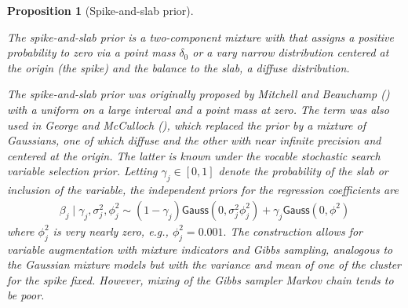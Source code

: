 \documentclass[
  11pt,
  letterpaper,
]{scrbook}
\theoremstyle{plain}
\newtheorem{proposition}{Proposition}[chapter]
\theoremstyle{definition}
\theoremstyle{definition}
\theoremstyle{plain}
\theoremstyle{plain}
\theoremstyle{definition}
\theoremstyle{remark}
\begin{document}
\begin{proposition}[Spike-and-slab
prior]\protect\hypertarget{prp-spike-slab}{}\label{prp-spike-slab}

The spike-and-slab prior is a two-component mixture with that assigns a
positive probability to zero via a point mass \(\delta_0\) or a vary
narrow distribution centered at the origin (the spike) and the balance
to the slab, a diffuse distribution.

The spike-and-slab prior was originally proposed by Mitchell and
Beauchamp () with a uniform
on a large interval and a point mass at zero. The term was also used in
George and McCulloch (), which
replaced the prior by a mixture of Gaussians, one of which diffuse and
the other with near infinite precision and centered at the origin. The
latter is known under the vocable stochastic search variable selection
prior. Letting \(\gamma_j \in [0,1]\) denote the probability of the slab
or inclusion of the variable, the independent priors for the regression
coefficients are \begin{align*}
 \beta_j \mid \gamma_j, \sigma_j^2,\phi^2_j \sim (1-\gamma_j) \mathsf{Gauss}(0, \sigma_j^2\phi^2_j) + \gamma_j \mathsf{Gauss}(0, \phi^2)
\end{align*} where \(\phi^2_j\) is very nearly zero, e.g.,
\(\phi_j^2=0.001.\) The construction allows for variable augmentation
with mixture indicators and Gibbs sampling, analogous to the Gaussian
mixture models but with the variance and mean of one of the cluster for
the spike fixed. However, mixing of the Gibbs sampler Markov chain tends
to be poor.

\end{proposition}
\end{document}
